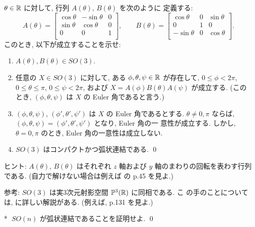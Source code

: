 \documentclass[12pt,twoside]{jarticle}
\def\qstar#1{$\!\!\!$#1$\;$}
\begin{document}
\begin{question}
  $\theta \in {\mathbb R}$ に対して, 行列 $A(\theta)$, $B(\theta)$ を次のように
  定義する:
  \[
    A(\theta)
    =
    \begin{bmatrix}
      \cos \theta & - \sin \theta & 0 \\
      \sin \theta &   \cos \theta & 0 \\
           0      &   0           & 1 \\
    \end{bmatrix},
    \qquad
    B(\theta)
    =
    \begin{bmatrix}
        \cos \theta & 0 & \sin \theta \\
             0      & 1 &      0      \\
      - \sin \theta & 0 & \cos \theta \\
    \end{bmatrix}.
  \]
  このとき, 以下が成立することを示せ:
  \begin{enumerate}
  \item $A(\theta), B(\theta) \in SO(3)$.
  \item 任意の $X \in SO(3)$ に対して, %
    ある $\phi, \theta, \psi \in {\mathbb R}$ が存在して, %
    $0 \le \phi < 2\pi$, $0 \le \theta \le \pi$, $0 \le \psi < 2\pi$, 
    および $X = A(\phi)B(\theta)A(\psi)$ が成立する. %
    (このとき, $(\phi, \theta, \psi)$ は $X$ の Euler 角であると言う.)
  \item $(\phi,\theta,\psi)$, $(\phi',\theta',\psi')$ は $X$ の Euler 
    角であるとする. $\theta \ne 0, \pi$ ならば, %
    $(\phi,\theta,\psi) = (\phi',\theta',\psi')$ となり, Euler 角の一
    意性が成立する. %
    しかし, $\theta = 0, \pi$ のとき, Euler 角の一意性は成立しない.
  \item $SO(3)$ はコンパクトかつ弧状連結である.
    \qed
  \end{enumerate}
\end{question}

\noindent ヒント: $A(\theta)$, $B(\theta)$ はそれぞれ $z$ 軸および $y$
軸のまわりの回転を表わす行列である. (自力で解けない場合は例えば 
\cite{YS} の p.45 を見よ.)

\noindent 参考: $SO(3)$ は実3次元射影空間 ${\mathbb P}^3({\mathbb R})$ に同相である. こ
の手のことについては, \cite{Yokota} に詳しい解説がある. (例えば, p.131 
を見よ.)

\begin{question}\qstar{*}
  $SO(n)$ が弧状連結であることを証明せよ. \qed
\end{question}
\end{document}
